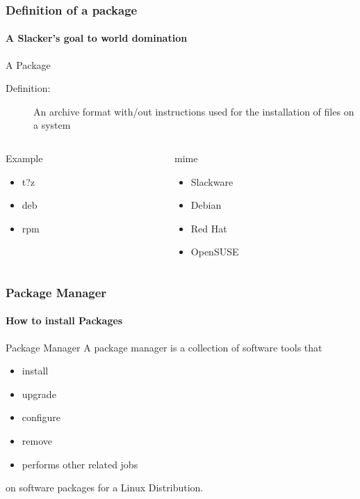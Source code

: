 \documentclass[12pt,hyperref={pdfpagelabels=true}]{beamer}
\begin{document}
\begin{frame}
  \frametitle{Definition of a package}
  \framesubtitle{A Slacker's goal to world domination}
  \begin{block}{A Package}
    \begin{description}
    \item[Definition:] An archive format with/out instructions used for the
      installation of files on a system
    \end{description}
  \end{block}

  \pause

  \begin{columns}
    \begin{column}{4cm}
      \begin{block}{Example}
        \begin{itemize}[<+-| alert@+>]
        \item<2-> t?z
        \item<3-> deb
        \item<4-> rpm
        \end{itemize}
      \end{block}
    \end{column}

    \begin{column}{4cm}
      \begin{block}{mime}
        \begin{itemize}[<+-| alert@+>]
        \item<2-> Slackware
        \item<3-> Debian
        \item<4-> Red Hat
        \item<4-> OpenSUSE
        \end{itemize}
      \end{block}
    \end{column}
  \end{columns}
\end{frame}

\begin{frame}
  \frametitle{Package Manager}
  \framesubtitle{How to install Packages}
  \begin{block}{Package Manager}
    A package manager is a collection of software tools that
    \begin{itemize}[<+-| alert@+>]
    \item<2,7>install
    \item<3,7> upgrade
    \item<4,7> configure
    \item<5,7> remove
    \item<6,7> performs other related jobs
    \end{itemize}

    \pause

    on software packages for a Linux Distribution.
  \end{block}
\end{frame}
\end{document}
